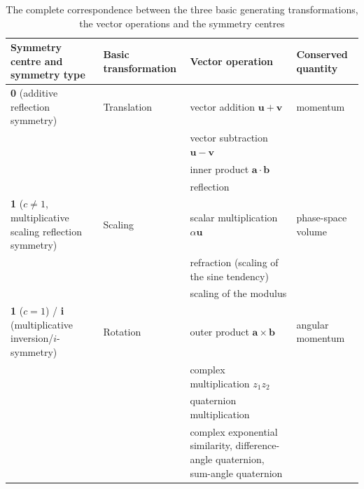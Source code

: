 \begin{table}[htbp]
    \centering
    \caption{The complete correspondence between the three basic generating transformations, the vector operations and the symmetry centres}
    \label{tab:symmetry_correspondence}
    \renewcommand{\arraystretch}{1.35}
    \begin{tabular}{>{\centering\arraybackslash}p{2.5cm}>{\centering\arraybackslash}p{2.5cm}>{\centering\arraybackslash}p{4.5cm}>{\centering\arraybackslash}p{3cm}}
        \toprule
        Symmetry centre and symmetry type & Basic transformation & Vector operation & Conserved quantity \\
        \midrule
        \textbf{0} (additive reflection symmetry) & Translation & vector addition $\mathbf{u}+\mathbf{v}$ & momentum \\[4pt]
         &  & vector subtraction $\mathbf{u}-\mathbf{v}$ &  \\[4pt]
         &  & inner product $\mathbf{a}\cdot\mathbf{b}$ &  \\[4pt]
         &  & reflection &  \\
        \midrule
        \textbf{1} ($c \neq 1$, multiplicative scaling reflection symmetry) & Scaling & scalar multiplication $\alpha\mathbf{u}$ & phase-space volume \\[4pt]
         &  & refraction (scaling of the sine tendency) &  \\[4pt]
         &  & scaling of the modulus &  \\
        \midrule
        \textbf{1} ($c=1$) / \textbf{i} (multiplicative inversion/$i$-symmetry) & Rotation & outer product $\mathbf{a}\times\mathbf{b}$ & angular momentum \\[4pt]
         &  & complex multiplication $z_1 z_2$ &  \\[4pt]
         &  & quaternion multiplication &  \\[4pt]
         &  & complex exponential similarity, difference-angle quaternion, sum-angle quaternion &  \\
        \bottomrule
    \end{tabular}
\end{table}

